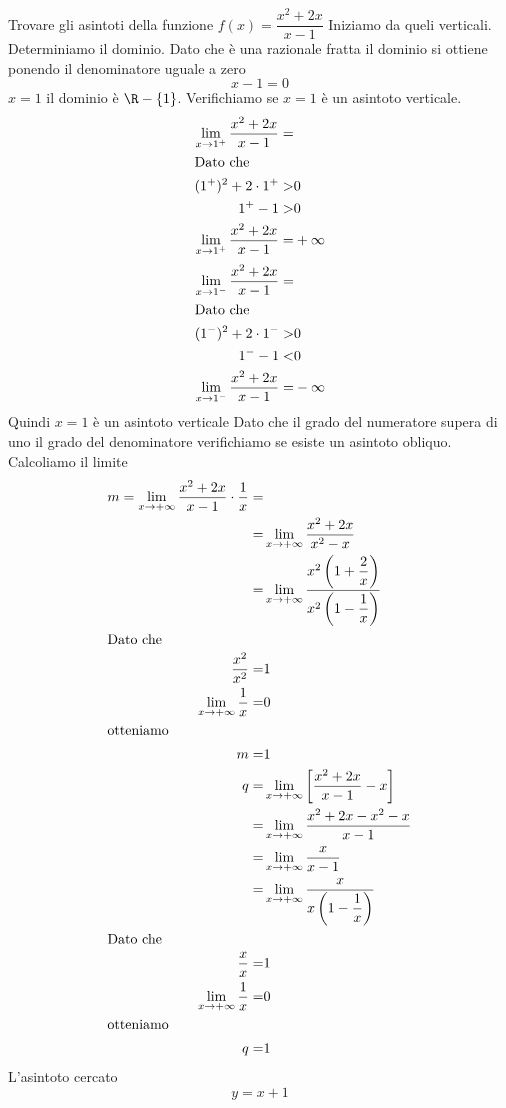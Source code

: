 \begin{exercise}
	Trovare gli asintoti della funzione $f(x)=\dfrac{x^2+2x}{x-1}$
	\tcblower
Iniziamo da queli verticali. Determiniamo il dominio. Dato che è una razionale fratta il dominio si ottiene ponendo il denominatore uguale a zero\[x-1=0\] $x=1$ il dominio è $\R-\lbrace1\rbrace$. Verifichiamo se $x=1$ è un asintoto verticale.
\begin{align*}
\lim_{x\to 1^+}\dfrac{x^2+2x}{x-1}=&\\
\intertext{Dato che}
(1^+)^2+2\cdot 1^+>&0\\
1^+-1>&0\\
\lim_{x\to 1^+}\dfrac{x^2+2x}{x-1}=&+\infty\\
\end{align*}
\begin{align*}
\lim_{x\to 1^-}\dfrac{x^2+2x}{x-1}=&\\
\intertext{Dato che}
(1^-)^2+2\cdot 1^->&0\\
1^--1<&0\\
\lim_{x\to 1^-}\dfrac{x^2+2x}{x-1}=&-\infty\\
\end{align*}
Quindi $x=1$ è un asintoto verticale
Dato che il grado del numeratore supera di uno il grado del denominatore verifichiamo se esiste un asintoto obliquo. Calcoliamo il limite
\begin{align*}
m=\lim_{x\to +\infty}\dfrac{x^2+2x}{x-1}\cdot\dfrac{1}{x}=&\\
=&\lim_{x\to +\infty}\dfrac{x^2+2x}{x^2-x}\\
=&\lim_{x\to +\infty}\dfrac{x^2\left(1+\dfrac{2}{x}\right)}{x^2\left(1-\dfrac{1}{x}\right)}\\
\intertext{Dato che}
\dfrac{x^2}{x^2}=&1\\
\lim_{x\to +\infty}\dfrac{1}{x}=&0\\
\intertext{otteniamo}
m=&1\\
q=&\lim_{x\to +\infty}\left[\dfrac{x^2+2x}{x-1}-x\right]\\
=&\lim_{x\to +\infty}\dfrac{x^2+2x-x^2-x}{x-1}\\
=&\lim_{x\to +\infty}\dfrac{x}{x-1}\\
=&\lim_{x\to +\infty}\dfrac{x}{x\left(1-\dfrac{1}{x}\right)}\\
\intertext{Dato che}
\dfrac{x}{x}=&1\\
\lim_{x\to +\infty}\dfrac{1}{x}=&0\\
\intertext{otteniamo}
q=&1\\
\end{align*}
L'asintoto cercato\[y=x+1\]
\end{exercise}
